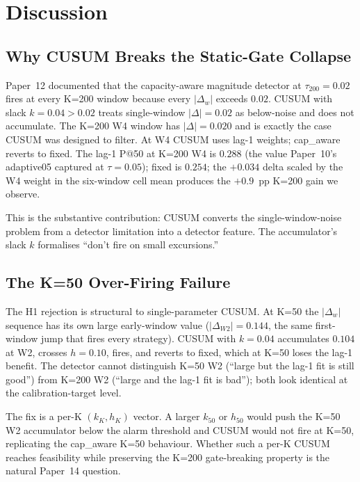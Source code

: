 \section{Discussion}

\subsection{Why CUSUM Breaks the Static-Gate Collapse}

Paper~12 documented that the capacity-aware magnitude detector at
$\tau_{200} = 0.02$ fires at every K=200 window because every
$|\Delta_w|$ exceeds $0.02$. CUSUM with slack $k = 0.04 > 0.02$
treats single-window $|\Delta| = 0.02$ as below-noise and does not
accumulate. The K=200 W4 window has $|\Delta| = 0.020$ and is
exactly the case CUSUM was designed to filter. At W4 CUSUM uses
lag-1 weights; cap\_aware reverts to fixed. The lag-1 P@50 at
K=200 W4 is $0.288$ (the value Paper~10's adaptive05 captured at
$\tau = 0.05$); fixed is $0.254$; the $+0.034$ delta scaled by the
W4 weight in the six-window cell mean produces the $+0.9$~pp K=200
gain we observe.

This is the substantive contribution: CUSUM converts the
single-window-noise problem from a detector limitation into a
detector feature. The accumulator's slack $k$ formalises ``don't
fire on small excursions.''

\subsection{The K=50 Over-Firing Failure}

The H1 rejection is structural to single-parameter CUSUM. At K=50
the $|\Delta_w|$ sequence has its own large early-window value
($|\Delta_{W2}| = 0.144$, the same first-window jump that fires
every strategy). CUSUM with $k = 0.04$ accumulates $0.104$ at W2,
crosses $h = 0.10$, fires, and reverts to fixed, which at K=50
loses the lag-1 benefit. The detector cannot distinguish K=50 W2
(``large but the lag-1 fit is still good'') from K=200 W2 (``large
and the lag-1 fit is bad''); both look identical at the
calibration-target level.

The fix is a per-K $(k_K, h_K)$ vector. A larger $k_{50}$ or
$h_{50}$ would push the K=50 W2 accumulator below the alarm
threshold and CUSUM would not fire at K=50, replicating the
cap\_aware K=50 behaviour. Whether such a per-K CUSUM reaches
feasibility while preserving the K=200 gate-breaking property is
the natural Paper~14 question.

